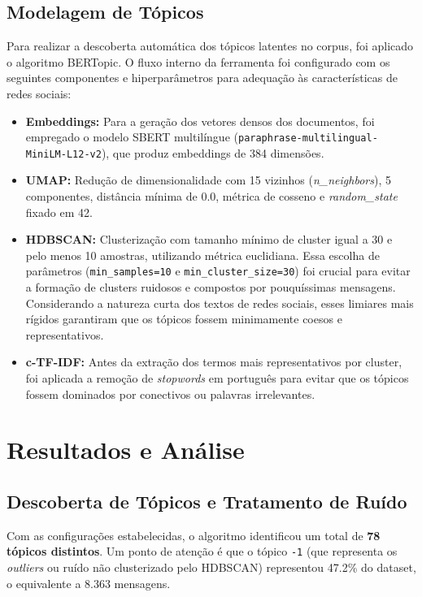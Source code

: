 \documentclass[10pt,twocolumn,a4paper]{article}
\begin{document}
\subsection{Modelagem de Tópicos}
Para realizar a descoberta automática dos tópicos latentes no corpus, foi aplicado o algoritmo BERTopic. O fluxo interno da ferramenta foi configurado com os seguintes componentes e hiperparâmetros para adequação às características de redes sociais:

\begin{itemize}
    \item \textbf{Embeddings:} Para a geração dos vetores densos dos documentos, foi empregado o modelo SBERT multilíngue (\texttt{paraphrase\allowbreak{}-multilingual\allowbreak{}-MiniLM\allowbreak{}-L12\allowbreak{}-v2}), que produz embeddings de 384 dimensões.
    \item \textbf{UMAP:} Redução de dimensionalidade com 15 vizinhos (\textit{n\_neighbors}), 5 componentes, distância mínima de $0.0$, métrica de cosseno e \textit{random\_state} fixado em 42.
    \item \textbf{HDBSCAN:} Clusterização com tamanho mínimo de cluster igual a 30 e pelo menos 10 amostras, utilizando métrica euclidiana. Essa escolha de parâmetros (\texttt{min\_samples=10} e \texttt{min\_cluster\_size=30}) foi crucial para evitar a formação de clusters ruidosos e compostos por pouquíssimas mensagens. Considerando a natureza curta dos textos de redes sociais, esses limiares mais rígidos garantiram que os tópicos fossem minimamente coesos e representativos.
    \item \textbf{c-TF-IDF:} Antes da extração dos termos mais representativos por cluster, foi aplicada a remoção de \textit{stopwords} em português para evitar que os tópicos fossem dominados por conectivos ou palavras irrelevantes.
\end{itemize}

\section{Resultados e Análise}

\subsection{Descoberta de Tópicos e Tratamento de Ruído}
Com as configurações estabelecidas, o algoritmo identificou um total de \textbf{78 tópicos distintos}. Um ponto de atenção é que o tópico \texttt{-1} (que representa os \textit{outliers} ou ruído não clusterizado pelo HDBSCAN) representou 47.2\% do dataset, o equivalente a $8.363$ mensagens.
\end{document}
